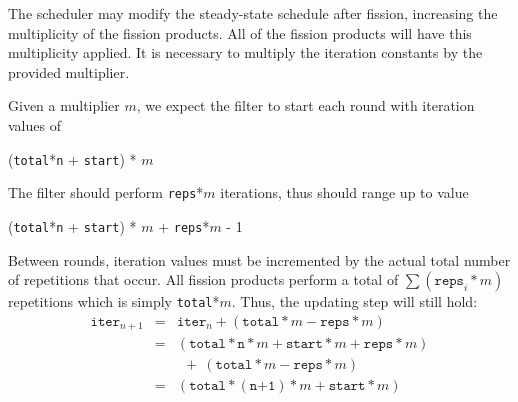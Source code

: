 The scheduler may modify the steady-state schedule after fission, increasing the multiplicity of the fission products.  All of the fission products will have this multiplicity applied. It is necessary to multiply the iteration constants by the provided multiplier.

Given a multiplier $m$, we expect the filter to start each round with iteration values of 
\begin{center}
(\texttt{total}*\texttt{n} + \texttt{start}) * $m$
\end{center}
The filter should perform \texttt{reps}*$m$ iterations, thus should range up to value
\begin{center}
(\texttt{total}*\texttt{n} + \texttt{start}) * $m$ + \texttt{reps}*$m$ - 1
\end{center}

Between rounds, iteration values must be incremented by the actual total number of repetitions that occur.  All fission products perform a total of $\sum(\texttt{reps}_{i}*m)$ repetitions which is simply \texttt{total}*$m$.  Thus, the updating step will still hold:
\begin{eqnarray*}
\texttt{iter}_{n+1} &=& \texttt{iter}_{n} + (\texttt{total}*m - \texttt{reps}*m) \\
&=& (\texttt{total}*\texttt{n}*m + \texttt{start}*m + \texttt{reps}*m) \\
&&  \ \ +\ (\texttt{total}*m - \texttt{reps}*m) \\
&=& (\texttt{total}*(\texttt{n+1})*m + \texttt{start}*m)
\end{eqnarray*}
